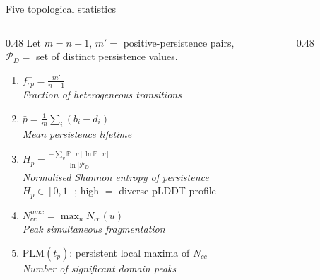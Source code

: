 \documentclass[aspectratio=169, 10pt]{beamer}
\begin{document}
\begin{frame}{Five topological statistics}
  \begin{columns}[T]
    \begin{column}{0.48\textwidth}
      Let $m=n{-}1$, $m'=$ positive-persistence pairs,\\
      $\mathcal{P}_D=$ set of distinct persistence values.
      \vspace{2pt}

      \begin{enumerate}\setlength{\itemsep}{0pt}\setlength{\parsep}{0pt}
        \item $\displaystyle f^+_{cp} = \frac{m'}{n-1}$\\
              \emph{Fraction of heterogeneous transitions}
        \vspace{2pt}
        \item $\displaystyle \bar{p} = \frac{1}{m}\sum_i (b_i - d_i)$\\
              \emph{Mean persistence lifetime}
        \vspace{2pt}
        \item $\displaystyle H_p = \frac{-\sum_{v} \mathbb{P}[v]\ln\mathbb{P}[v]}{\ln|\mathcal{P}_D|}$\\
              \emph{Normalised Shannon entropy of persistence}\\
              $H_p \in [0,1]$; high $=$ diverse pLDDT profile
        \vspace{2pt}
        \item $N_{cc}^{max} = \max_u N_{cc}(u)$\\
              \emph{Peak simultaneous fragmentation}
        \vspace{2pt}
        \item $\mathrm{PLM}(t_p)$: persistent local maxima of $N_{cc}$\\
              \emph{Number of significant domain peaks}
      \end{enumerate}
    \end{column}
    \begin{column}{0.48\textwidth}
\end{column}
\end{columns}
\end{frame}
\end{document}
